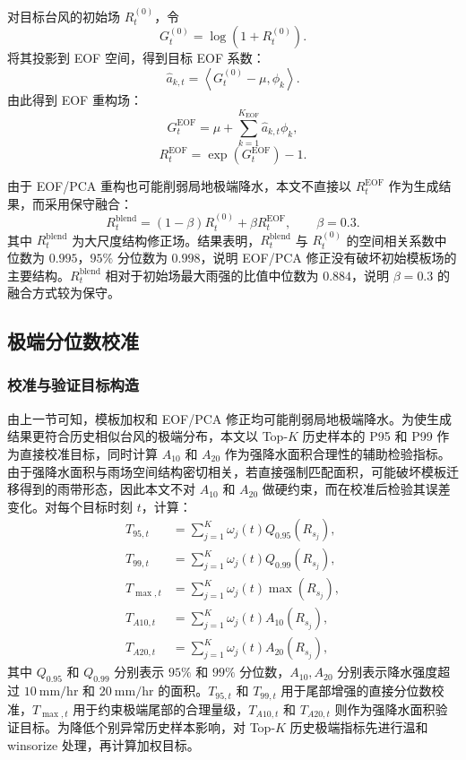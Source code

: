 \documentclass[UTF8,a4paper,zihao=5]{ctexart}
\numberwithin{equation}{section}
\numberwithin{figure}{section}
\numberwithin{table}{section}
\begin{document}
对目标台风的初始场 $R_t^{(0)}$，令
\begin{equation}
G_t^{(0)}=\log\left(1+R_t^{(0)}\right).
\end{equation}
将其投影到 EOF 空间，得到目标 EOF 系数：
\begin{equation}
\hat a_{k,t}
=
\left\langle
G_t^{(0)}-\mu,\phi_k
\right\rangle.
\end{equation}
由此得到 EOF 重构场：
\begin{equation}
G_t^{\mathrm{EOF}}
=
\mu+\sum_{k=1}^{K_{\mathrm{EOF}}}\hat a_{k,t}\phi_k,
\end{equation}
\begin{equation}
R_t^{\mathrm{EOF}}
=
\exp\left(G_t^{\mathrm{EOF}}\right)-1.
\end{equation}

由于 EOF/PCA 重构也可能削弱局地极端降水，本文不直接以 $R_t^{\mathrm{EOF}}$ 作为生成结果，而采用保守融合：
\begin{equation}
R_t^{\mathrm{blend}}
=
(1-\beta)R_t^{(0)}+\beta R_t^{\mathrm{EOF}},
\qquad \beta=0.3.
\end{equation}
其中 $R_t^{\mathrm{blend}}$ 为大尺度结构修正场。结果表明，$R_t^{\mathrm{blend}}$ 与 $R_t^{(0)}$ 的空间相关系数中位数为 $0.995$，$95\%$ 分位数为 $0.998$，说明 EOF/PCA 修正没有破坏初始模板场的主要结构。$R_t^{\mathrm{blend}}$ 相对于初始场最大雨强的比值中位数为 $0.884$，说明 $\beta=0.3$ 的融合方式较为保守。

\subsection{极端分位数校准}

\subsubsection{校准与验证目标构造}

由上一节可知，模板加权和 EOF/PCA 修正均可能削弱局地极端降水。为使生成结果更符合历史相似台风的极端分布，本文以 Top-$K$ 历史样本的 P95 和 P99 作为直接校准目标，同时计算 $A_{10}$ 和 $A_{20}$ 作为强降水面积合理性的辅助检验指标。由于强降水面积与雨场空间结构密切相关，若直接强制匹配面积，可能破坏模板迁移得到的雨带形态，因此本文不对 $A_{10}$ 和 $A_{20}$ 做硬约束，而在校准后检验其误差变化。对每个目标时刻 $t$，计算：
\begin{align}
T_{95,t} &= \sum_{j=1}^{K}\omega_j(t)Q_{0.95}(R_{s_j}),\\
T_{99,t} &= \sum_{j=1}^{K}\omega_j(t)Q_{0.99}(R_{s_j}),\\
T_{\max,t} &= \sum_{j=1}^{K}\omega_j(t)\max(R_{s_j}),\\
T_{A10,t} &= \sum_{j=1}^{K}\omega_j(t)A_{10}(R_{s_j}),\\
T_{A20,t} &= \sum_{j=1}^{K}\omega_j(t)A_{20}(R_{s_j}),
\end{align}
其中 $Q_{0.95}$ 和 $Q_{0.99}$ 分别表示 $95\%$ 和 $99\%$ 分位数，$A_{10},A_{20}$ 分别表示降水强度超过 $10\ \mathrm{mm/hr}$ 和 $20\ \mathrm{mm/hr}$ 的面积。$T_{95,t}$ 和 $T_{99,t}$ 用于尾部增强的直接分位数校准，$T_{\max,t}$ 用于约束极端尾部的合理量级，$T_{A10,t}$ 和 $T_{A20,t}$ 则作为强降水面积验证目标。为降低个别异常历史样本影响，对 Top-$K$ 历史极端指标先进行温和 winsorize 处理，再计算加权目标。
\end{document}
